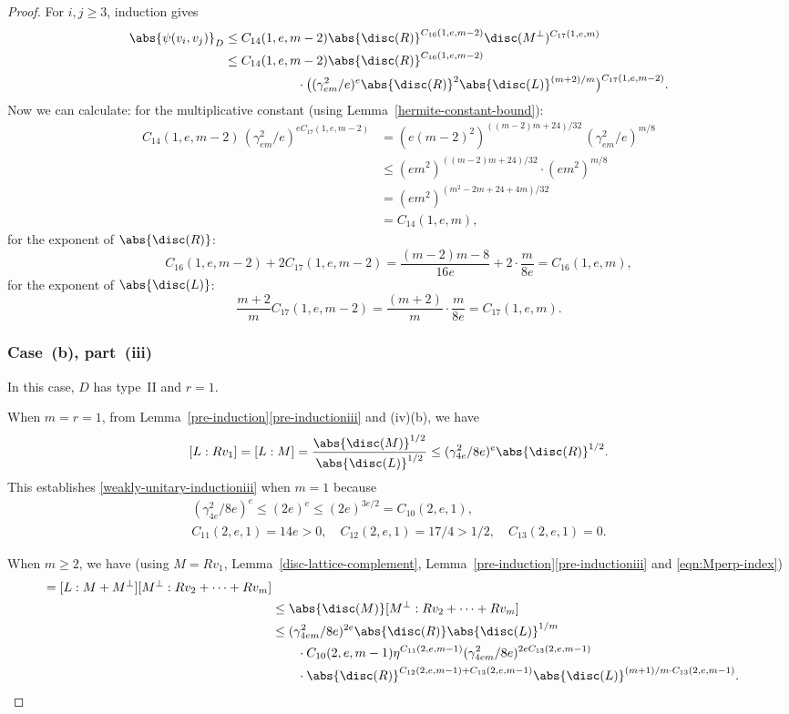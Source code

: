 \begin{proof}
For $i, j \geq 3$, induction gives
\begin{align*}
\abs{\psi(v_i, v_j)}_D
& \leq C_{14}(1,e,m-2) \abs{\disc(R)}^{C_{16}(1,e,m-2)} \disc(M^\perp)^{C_{17}(1,e,m)}
\\& \leq C_{14}(1,e,m-2) \abs{\disc(R)}^{C_{16}(1,e,m-2)}
\\& \hspace*{2cm} \cdot \bigl( (\gamma_{em}^2/e)^{e} \abs{\disc(R)}^2 \abs{\disc(L)}^{(m+2)/m} \bigr)^{C_{17}(1,e,m-2)}.
\end{align*}
Now we can calculate:
for the multiplicative constant (using Lemma~\ref{hermite-constant-bound}):
\begin{align*}
C_{14}(1,e,m-2) \, (\gamma_{em}^2/e)^{eC_{17}(1,e,m-2)}& = (e(m-2)^2)^{((m-2)m+24)/32} \, (\gamma_{em}^2/e)^{m/8}
\\& \leq (em^2)^{((m-2)m+24)/32} \cdot (em^2)^{m/8}
\\& = (em^2)^{(m^2-2m+24 + 4m)/32}
\\& = C_{14}(1,e,m),
\end{align*}
for the exponent of $\abs{\disc(R)}$:
\[
C_{16}(1,e,m-2) + 2C_{17}(1,e,m-2) = \frac{(m-2)m-8}{16e} + 2 \cdot \frac{m}{8e}
= C_{16}(1,e,m),
\]
for the exponent of $\abs{\disc(L)}$:
\[
\frac{m+2}{m} C_{17}(1,e,m-2) = \frac{(m+2)}{m} \cdot \frac{m}{8e}
= C_{17}(1,e,m).
\]

\subsubsection*{Case~(b), part~(iii)}
In this case, $D$ has type~II and $r=1$.

When $m=r=1$, from Lemma~\ref{pre-induction}\eqref{pre-inductioniii} and (iv)(b), we have
\[
[L:Rv_1] = [L:M] = \frac{\abs{\disc(M)}^{1/2}}{\abs{\disc(L)}^{1/2}} \leq (\gamma_{4e}^2/8e)^{e} \abs{\disc(R)}^{1/2}.
\]
This establishes \eqref{weakly-unitary-inductioniii} when $m=1$ because
\begin{gather*}
(\gamma_{4e}^2/8e)^e \leq (2e)^e \leq (2e)^{3e/2} = C_{10}(2,e,1),
\\ C_{11}(2,e,1) = 14e > 0,
\quad C_{12}(2,e,1) = 17/4 > 1/2,
\quad C_{13}(2,e,1) = 0.
\end{gather*}

When $m \geq 2$, we have (using $M = Rv_1$, Lemma~\ref{disc-lattice-complement}, Lemma~\ref{pre-induction}\eqref{pre-inductioniii} and \eqref{eqn:Mperp-index})
\begin{align*}
[L : Rv_1 &+ \dotsb + Rv_m]
= [L : M + M^\perp] [M^\perp : Rv_2 + \dotsb + Rv_m]
\\& \leq \abs{\disc(M)} [M^\perp : Rv_2 + \dotsb + Rv_m]
\\& \leq (\gamma_{4em}^2/8e)^{2e} \abs{\disc(R)} \abs{\disc(L)}^{1/m}
\\& \qquad \cdot C_{10}(2,e,m-1) \eta^{C_{11}(2,e,m-1)} (\gamma_{4em}^2/8e)^{2eC_{13}(2,e,m-1)}
\\& \qquad \cdot \abs{\disc(R)}^{C_{12}(2,e,m-1) + C_{13}(2,e,m-1)} \abs{\disc(L)}^{(m+1)/m \cdot C_{13}(2,e,m-1)}.
\end{align*}


\end{proof}
